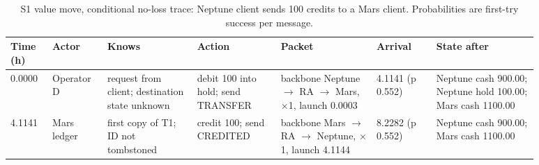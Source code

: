 {\setlength{\tabcolsep}{3pt}\begin{longtable}{@{}p{0.07\linewidth}p{0.09\linewidth}p{0.15\linewidth}p{0.14\linewidth}p{0.16\linewidth}p{0.1\linewidth}p{0.17\linewidth}@{}}
\caption{S1 value move, conditional no-loss trace: Neptune client sends 100 credits to a Mars client. Probabilities are first-try success per message.}\\
\toprule
Time (h) & Actor & Knows & Action & Packet & Arrival & State after \\
\midrule
\endhead
0.0000 & Operator D & request from client; destination state unknown & debit 100 into hold; send TRANSFER & backbone Neptune $\to$ RA $\to$ Mars, $\times$1, launch 0.0003 & 4.1141 (p 0.552) & Neptune cash 900.00; Neptune hold 100.00; Mars cash 1100.00 \\
4.1141 & Mars ledger & first copy of T1; ID not tombstoned & credit 100; send CREDITED & backbone Mars $\to$ RA $\to$ Neptune, $\times$1, launch 4.1144 & 8.2282 (p 0.552) & Neptune cash 900.00; Mars cash 1100.00 \\
\bottomrule
\end{longtable}}

